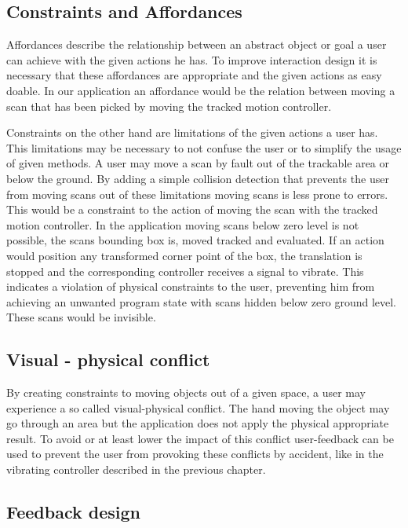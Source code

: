 \documentclass[hyperref,english,bachelorofscience,bibnum]{cgvpub}
\begin{document}
\subsection{Constraints and Affordances}

Affordances describe the relationship between an abstract object or goal a user can achieve with the given actions he has\cite{Jerald2015}.
To improve interaction design it is necessary that these affordances are appropriate and the given actions as easy doable\cite{Jerald2015}.
In our application an affordance would be the relation between moving a scan that has been picked by moving the tracked motion controller. 

Constraints on the other hand are limitations of the given actions a user has. This limitations may be necessary to not confuse the user or to simplify the usage of given methods. A user may move a scan by fault out of the trackable area or below the ground. By adding a simple collision detection that prevents the user from moving scans out of these limitations moving scans is less prone to errors. This would be a constraint to the action of moving the scan with the tracked motion controller. In the application moving scans below zero level is not possible, the scans bounding box is, moved tracked and evaluated. If an action would position any transformed corner point of the box, the translation is stopped and the corresponding controller receives a signal to vibrate. This indicates a violation of physical constraints to the user, preventing him from achieving an unwanted program state with scans hidden below zero ground level. These scans would be invisible.

\subsection{Visual - physical conflict}

By creating constraints to moving objects out of a given space, a user may experience a so called visual-physical conflict. The hand moving the object may go through an area but the application does not apply the physical appropriate result\cite{Jerald2015}.
To avoid or at least lower the impact of this conflict user-feedback can be used to prevent the user from provoking these conflicts by accident, like in the vibrating controller described in the previous chapter.

\subsection{Feedback design}
\end{document}
